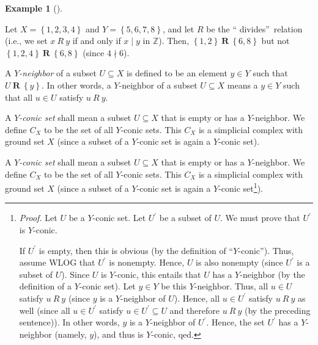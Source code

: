 \documentclass[numbers=enddot,12pt,final,onecolumn,notitlepage]{scrartcl}%
\theoremstyle{definition}
\newtheorem{exam}[theo]{Example}
\newenvironment{example}[1][]
{\begin{exam}[#1]\begin{leftbar}}
{\end{leftbar}\end{exam}}
\newenvironment{verlong}{}{}
\newenvironment{vershort}{}{}
\begin{document}
\begin{example}
\label{exa.dowker.1}Let $X=\left\{  1,2,3,4\right\}  $ and $Y=\left\{
5,6,7,8\right\}  $, and let $R$ be the \textquotedblleft
divides\textquotedblright\ relation (i.e., we set $x\ R\ y$ if and only if
$x\mid y$ in $\mathbb{Z}$). Then, $\left\{  1,2\right\}  \ \mathbf{R}%
\ \left\{  6,8\right\}  $ but not $\left\{  1,2,4\right\}  \ \mathbf{R}%
\ \left\{  6,8\right\}  $ (since $4\nmid6$).
\end{example}

A $Y$\emph{-neighbor} of a subset $U\subseteq X$ is defined to be an element
$y\in Y$ such that $U\ \mathbf{R}\ \left\{  y\right\}  $. In other words, a
$Y$-neighbor of a subset $U\subseteq X$ means a $y\in Y$ such that all $u\in
U$ satisfy $u\ R\ y$.

\begin{vershort}
A $Y$\emph{-conic set} shall mean a subset $U\subseteq X$ that is empty or has
a $Y$-neighbor. We define $C_{X}$ to be the set of all $Y$-conic sets. This
$C_{X}$ is a simplicial complex with ground set $X$ (since a subset of a
$Y$-conic set is again a $Y$-conic set).
\end{vershort}

\begin{verlong}
A $Y$\emph{-conic set} shall mean a subset $U\subseteq X$ that is empty or has
a $Y$-neighbor. We define $C_{X}$ to be the set of all $Y$-conic sets. This
$C_{X}$ is a simplicial complex with ground set $X$ (since a subset of a
$Y$-conic set is again a $Y$-conic set\footnote{\textit{Proof.} Let $U$ be a
$Y$-conic set. Let $U^{\prime}$ be a subset of $U$. We must prove that
$U^{\prime}$ is $Y$-conic.
\par
If $U^{\prime}$ is empty, then this is obvious (by the definition of
\textquotedblleft$Y$-conic\textquotedblright). Thus, assume WLOG that
$U^{\prime}$ is nonempty. Hence, $U$ is also nonempty (since $U^{\prime}$ is a
subset of $U$). Since $U$ is $Y$-conic, this entails that $U$ has a
$Y$-neighbor (by the definition of a $Y$-conic set). Let $y\in Y$ be this
$Y$-neighbor. Thus, all $u\in U$ satisfy $u\ R\ y$ (since $y$ is a
$Y$-neighbor of $U$). Hence, all $u\in U^{\prime}$ satisfy $u\ R\ y$ as well
(since all $u\in U^{\prime}$ satisfy $u\in U^{\prime}\subseteq U$ and
therefore $u\ R\ y$ (by the preceding sentence)). In other words, $y$ is a
$Y$-neighbor of $U^{\prime}$. Hence, the set $U^{\prime}$ has a $Y$-neighbor
(namely, $y$), and thus is $Y$-conic, qed.}).
\end{verlong}
\end{document}
